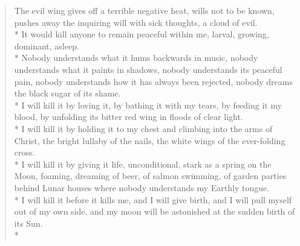 \documentclass[english,11pt,letterpaper,onecolumn]{scrbook}
\begin{document}
\begin{verse}
The evil wing gives off a terrible negative heat, wills not to be known, pushes away the inquiring will with sick thoughts, a cloud of evil. \\*
It would kill anyone to remain peaceful within me, larval, growing, dominant, asleep. \\*
Nobody understands what it hums backwards in music, nobody understands what it paints in shadows, nobody understands its peaceful pain, nobody understands how it has always been rejected, nobody dreams the black sugar of its shame. \\*
I will kill it by loving it, by bathing it with my tears, by feeding it my blood, by unfolding its bitter red wing in floods of clear light. \\*
I will kill it by holding it to my chest and climbing into the arms of Christ, the bright lullaby of the nails, the white wings of the ever-folding cross. \\*
I will kill it by giving it life, unconditional, stark as a spring on the Moon, foaming, dreaming of beer, of salmon swimming, of garden parties behind Lunar houses where nobody understands my Earthly tongue. \\*
I will kill it before it kills me, and I will give birth, and I will pull myself out of my own side, and my moon will be astonished at the sudden birth of its Sun.\\*
\end{verse}

\newpage
{}
\end{document}

